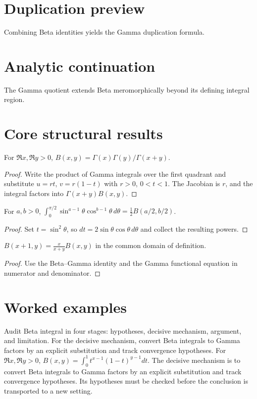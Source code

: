 \section{Duplication preview}
Combining Beta identities yields the Gamma duplication formula.

\section{Analytic continuation}
The Gamma quotient extends Beta meromorphically beyond its defining integral region.

\section{Core structural results}

\begin{theorem}\label{thm:iv20-01}
For $\Re x,\Re y>0$, $B(x,y)=\Gamma(x)\Gamma(y)/\Gamma(x+y)$.
\begin{proof}
Write the product of Gamma integrals over the first quadrant and substitute $u=r t$, $v=r(1-t)$ with $r>0$, $0<t<1$. The Jacobian is $r$, and the integral factors into $\Gamma(x+y)B(x,y)$.
\end{proof}
\end{theorem}

\begin{theorem}\label{thm:iv20-02}
For $a,b>0$, $\int_0^{\pi/2}\sin^{a-1}\theta\cos^{b-1}\theta\,d\theta=\frac12B(a/2,b/2)$.
\begin{proof}
Set $t=\sin^2\theta$, so $dt=2\sin\theta\cos\theta\,d\theta$ and collect the resulting powers.
\end{proof}
\end{theorem}

\begin{theorem}\label{thm:iv20-03}
$B(x+1,y)=\frac{x}{x+y}B(x,y)$ in the common domain of definition.
\begin{proof}
Use the Beta--Gamma identity and the Gamma functional equation in numerator and denominator.
\end{proof}
\end{theorem}

\section{Worked examples}

\begin{example}\label{ex:iv20-worked-01}
Audit Beta integral in four stages: hypotheses, decisive mechanism, argument, and limitation. For the decisive mechanism, convert Beta integrals to Gamma factors by an explicit substitution and track convergence hypotheses. For $\Re x,\Re y>0$, $B(x,y)=\int_0^1 t^{x-1}(1-t)^{y-1}dt$. The decisive mechanism is to convert Beta integrals to Gamma factors by an explicit substitution and track convergence hypotheses. Its hypotheses must be checked before the conclusion is transported to a new setting.
\end{example}

